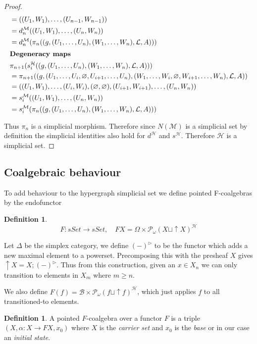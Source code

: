 \documentclass[12pt]{article}
\theoremstyle{definition}
\newtheorem{definition}[theorem]{Definition}
\newcommand{\1}{\mathbbm{1}}
\newcommand{\B}{\mathcal{B}}
\newcommand{\M}{\mathcal{M}}
\renewcommand{\H}{\mathcal{H}}
\newcommand{\finP}{\mathcal{P}_{\omega}}
\newcommand{\seq}{;}
\begin{document}
\begin{proof}
\begin{align*}
        &= ((U_1, W_1), \ldots, (U_{n-1}, W_{n-1})) \\
        &= d_n^\mathcal{M}((U_1, W_1), \ldots, (U_n, W_n)) \\
        &= d_n^\mathcal{M}(\pi_n((g, (U_1, \ldots, U_n), (W_1, \ldots, W_n), \mathcal{L}, A)))\\
        \intertext{\textbf{Degeneracy maps}}
        &\pi_{n+1}(s_i^\mathcal{H}((g, (U_1, \ldots, U_n), (W_1, \ldots, W_n), \mathcal{L}, A))) \\
        &= \pi_{n+1}((g, (U_1, \ldots, U_i, \varnothing, U_{i+1}, \ldots, U_n), (W_1, \ldots, W_i, \varnothing, W_{i+1}, \ldots, W_n), \mathcal{L}, A)) \\
        &= ((U_1, W_1), \ldots, (U_i, W_i), (\varnothing, \varnothing), (U_{i+1}, W_{i+1}), \ldots, (U_n, W_n)) \\
        &= s_i^\mathcal{M}((U_1, W_1), \ldots, (U_n, W_n)) \\
        &= s_i^\mathcal{M}(\pi_n((g, (U_1, \ldots, U_n), (W_1, \ldots, W_n), \mathcal{L}, A)))
    \end{align*}

    Thus $\pi_n$ is a simplicial morphism. Therefore since $N(\M)$ is a simplicial set by definition the simplicial identities also hold for $d^{\H}$ and $s^{\H}$. Therefore $\H$ is a simplicial set.
\end{proof}

\subsection{Coalgebraic behaviour}
To add behaviour to the hypergraph simplicial set we define pointed F-coalgebras by the endofunctor

\begin{definition}
    \[
        F: sSet \to sSet, \quad FX = \Omega \times \finP(X \sqcup \uparrow X)^{\H}
    \]
    
    Let $\Delta$ be the simplex category, we define $(-)^{\rhd}$ to be the functor which adds a new maximal element to a powerset. Precomposing this with the presheaf $X$ gives $\uparrow X = X\seq (-)^{\rhd}$. Thus from this construction, given an $x\in X_n$ we can only transition to elements in $X_m$ where $m\geq n$.
    
    We also define $F(f) = \B\times\finP(f \sqcup \uparrow f)^{\H}$, which just applies $f$ to all transitioned-to elements.
\end{definition}

\begin{definition}
    A pointed $F$-coalgebra over a functor $F$ is a triple $(X, \alpha: X\to FX, x_0)$ where $X$ is the \emph{carrier set} and $x_0$ is the \emph{base} or in our case an \emph{initial state}.
\end{definition}
\end{document}
